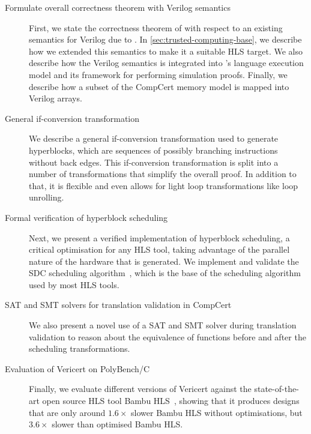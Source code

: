 \begin{description}
\item[Formulate overall correctness theorem with Verilog semantics] First, we
  state the correctness theorem of \vericert{} with respect to an existing
  semantics for Verilog due to \textcite{lööw19_proof_trans_veril_devel_hol}. In
  \cref{sec:trusted-computing-base}, we describe how we extended this semantics
  to make it a suitable \gls{HLS} target.  We also describe how the Verilog
  semantics is integrated into \compcert{}'s language execution model and its
  framework for performing simulation proofs.  Finally, we describe how a subset
  of the \gls{CompCert} memory model is mapped into Verilog arrays.

\item[General if-conversion transformation] We describe a general if-conversion
  transformation used to generate hyperblocks, which are sequences of possibly
  branching instructions without back edges.  This if-conversion transformation
  is split into a number of transformations that simplify the overall proof.  In
  addition to that, it is flexible and even allows for light loop
  transformations like loop unrolling.

\item[Formal verification of hyperblock scheduling] Next, we present a verified
  implementation of hyperblock scheduling, a critical optimisation for any
  \gls{HLS} tool, taking advantage of the parallel nature of the hardware that
  is generated.  We implement and validate the \gls{SDC} scheduling
  algorithm~\cite{cong06_sdc}, which is the base of the scheduling algorithm
  used by most \gls{HLS} tools.

\item[SAT and SMT solvers for translation validation in CompCert] We also
  present a novel use of a SAT and SMT solver during translation validation to
  reason about the equivalence of functions before and after the scheduling
  transformations.


\item[Evaluation of Vericert on PolyBench/C] Finally, we evaluate different
  versions of Vericert against the state-of-the-art open source \gls{HLS} tool
  Bambu HLS~\cite{pilato13_bambu}, showing that it produces designs that are
  only around $1.6\times$ slower Bambu HLS without optimisations, but
  $3.6\times$ slower than optimised Bambu HLS.
\end{description}

